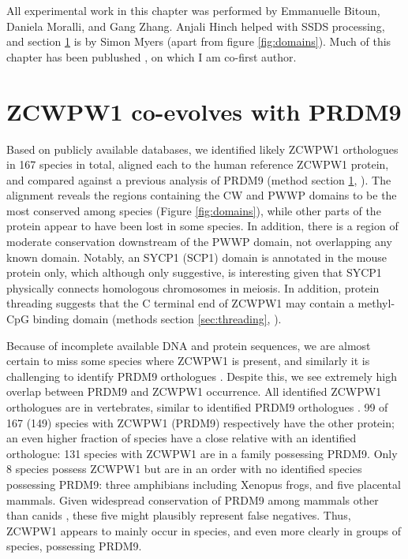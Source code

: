 \vspace{0.7cm}
\begin{framed}
\noindent All experimental work in this chapter was performed by Emmanuelle Bitoun, Daniela Moralli, and Gang Zhang.
Anjali Hinch helped with SSDS processing, and section \ref{sec:coevolution} is by Simon Myers (apart from figure \ref{fig:domains}).
Much of this chapter has been publushed \cite{Wells2020ZCWPW1}, on which I am co-first author.
\end{framed}

\section{ZCWPW1 co-evolves with PRDM9}
\label{sec:coevolution}
Based on publicly available databases, we identified likely ZCWPW1 orthologues in 167 species in total, aligned each to the human reference ZCWPW1 protein, and compared against a previous analysis of PRDM9 (method section \ref{sec:coevolution}, \cite{Baker2017Repeated}).
The alignment reveals the regions containing the CW and PWWP domains to be the most conserved among species (Figure \ref{fig:domains}), while other parts of the protein appear to have been lost in some species.
In addition, there is a region of moderate conservation downstream of the PWWP domain, not overlapping any known domain.
Notably, an SYCP1 (SCP1) domain is annotated in the mouse protein only, which although only suggestive, is interesting given that SYCP1 physically connects homologous chromosomes in meiosis.
In addition, protein threading suggests that the C terminal end of ZCWPW1 may contain a methyl-CpG binding domain (methods section \ref{sec:threading}, \cite{Lobley2009pGenTHREADER}).


Because of incomplete available DNA and protein sequences, we are almost certain to miss some species where ZCWPW1 is present, and similarly it is challenging to identify PRDM9 orthologues \parencite{Baker2017Repeated}.
Despite this, we see extremely high overlap between PRDM9 and ZCWPW1 occurrence.
All identified ZCWPW1 orthologues are in vertebrates, similar to identified PRDM9 orthologues \parencite{Baker2017Repeated}.
99 of 167 (149) species with ZCWPW1 (PRDM9) respectively have the other protein; an even higher fraction of species have a close relative with an identified orthologue: 131 species with ZCWPW1 are in a family possessing PRDM9.
Only 8 species possess ZCWPW1 but are in an order with no identified species possessing PRDM9: three amphibians including Xenopus frogs, and five placental mammals.
Given widespread conservation of PRDM9 among mammals other than canids \parencite{Baker2017Repeated}, these five might plausibly represent false negatives.
Thus, ZCWPW1 appears to mainly occur in species, and even more clearly in groups of species, possessing PRDM9.



